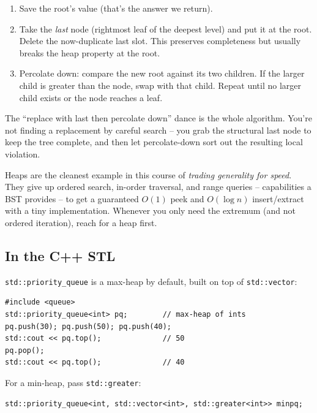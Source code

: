 \documentclass[11pt]{article}
\begin{document}
\begin{enumerate}[leftmargin=*]
    \item Save the root's value (that's the answer we return).
    \item Take the \emph{last} node (rightmost leaf of the deepest level) and put it at the root. Delete the now-duplicate last slot. This preserves completeness but usually breaks the heap property at the root.
    \item Percolate down: compare the new root against its two children. If the larger child is greater than the node, swap with that child. Repeat until no larger child exists or the node reaches a leaf.
\end{enumerate}

The ``replace with last then percolate down'' dance is the whole algorithm. You're not finding a replacement by careful search -- you grab the structural last node to keep the tree complete, and then let percolate-down sort out the resulting local violation.

\begin{ideabox}
Heaps are the cleanest example in this course of \emph{trading generality for speed}. They give up ordered search, in-order traversal, and range queries -- capabilities a BST provides -- to get a guaranteed $O(1)$ peek and $O(\log n)$ insert/extract with a tiny implementation. Whenever you only need the extremum (and not ordered iteration), reach for a heap first.
\end{ideabox}

\subsection*{In the C++ STL}

\texttt{std::priority\_queue} is a max-heap by default, built on top of \texttt{std::vector}:

\begin{lstlisting}
#include <queue>
std::priority_queue<int> pq;        // max-heap of ints
pq.push(30); pq.push(50); pq.push(40);
std::cout << pq.top();              // 50
pq.pop();
std::cout << pq.top();              // 40
\end{lstlisting}

For a min-heap, pass \texttt{std::greater}:

\begin{lstlisting}
std::priority_queue<int, std::vector<int>, std::greater<int>> minpq;
\end{lstlisting}
\end{document}
